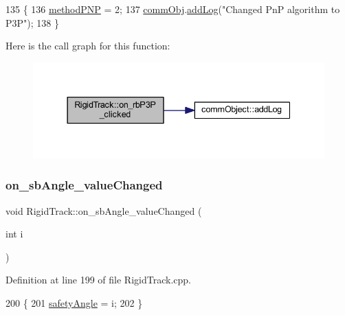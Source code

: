 \begin{DoxyCode}
135 \{
136     \hyperlink{main_8cpp_ab5e634b66221f494504aea1557af5df9}{methodPNP} = 2;
137     \hyperlink{main_8cpp_af29e7fc07ae0979d5fb61b473241d33d}{commObj}.\hyperlink{classcomm_object_aec354c7099b3039083cc4224e071e022}{addLog}(\textcolor{stringliteral}{"Changed PnP algorithm to P3P"});
138 \}
\end{DoxyCode}
Here is the call graph for this function\+:\nopagebreak
\begin{figure}[H]
\begin{center}
\leavevmode
\includegraphics[width=337pt]{class_rigid_track_ac1f10ea5ec3f718c152e245a04776454_cgraph}
\end{center}
\end{figure}
\mbox{\label{class_rigid_track_a217ca3d828c99943ea155e6891264b24}} 
\subsubsection{\texorpdfstring{on\+\_\+sb\+Angle\+\_\+value\+Changed}{on\_sbAngle\_valueChanged}}
{\footnotesize\ttfamily void Rigid\+Track\+::on\+\_\+sb\+Angle\+\_\+value\+Changed (\begin{DoxyParamCaption}\item[{int}]{i }\end{DoxyParamCaption})\hspace{0.3cm}{\ttfamily [slot]}}



Definition at line 199 of file Rigid\+Track.\+cpp.


\begin{DoxyCode}
200 \{
201     \hyperlink{main_8cpp_ae65386c3310ab826e84fba757296de9a}{safetyAngle} = i;
202 \}
\end{DoxyCode}
\mbox{\label{class_rigid_track_a72e338d6bf93d0efa3bc503f7ca736c5}} 
